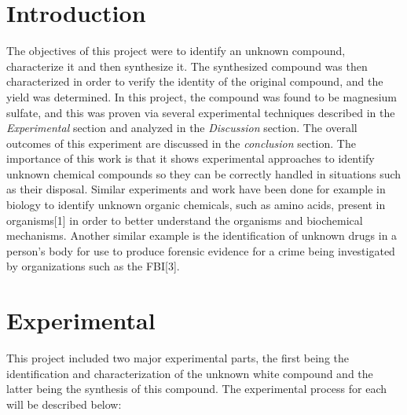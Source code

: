\documentclass[12pt]{article}
\begin{document}

\nocite{*}

\printbibliography

\section{Introduction}\doublespacing

The objectives of this project were to identify an unknown compound, characterize it and then synthesize it. The synthesized compound was then characterized in order to verify the identity of the original compound, and the yield was determined. In this project, the compound was found to be magnesium sulfate, and this was proven via several experimental techniques described in the \textit{Experimental} section and analyzed in the \textit{Discussion} section. The overall outcomes of this experiment are discussed in the \textit{conclusion} section.  The importance of this work is that it shows experimental approaches to identify unknown chemical compounds so they can be correctly handled in situations such as their disposal. Similar experiments and work have been done for example in biology to identify unknown organic chemicals, such as amino acids, present in organisms[1] in order to better understand the organisms and biochemical mechanisms. Another similar example is the identification of unknown drugs in a person's body for use to produce forensic evidence for a crime being investigated by organizations such as the FBI[3].




\section{Experimental}
This project included two major experimental parts, the first being the identification and characterization of the unknown white compound and the latter being the synthesis of this compound. The experimental process for each will be described below:
\end{document}
